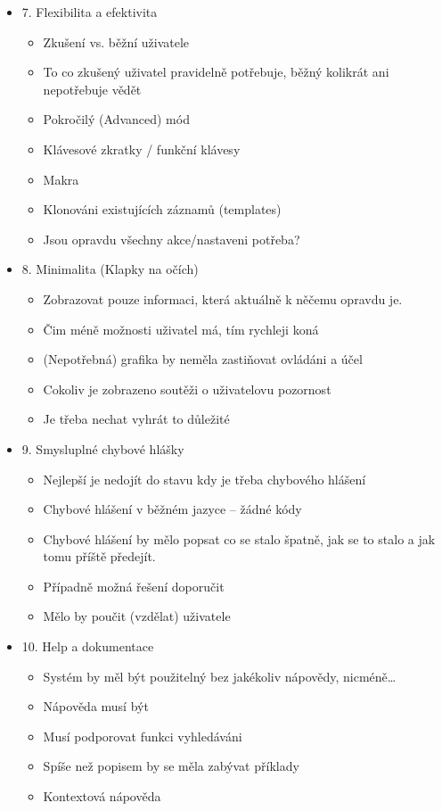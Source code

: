 \begin{itemize}
    \item 7. Flexibilita a efektivita
        \begin{itemize}
            \item Zkušení vs. běžní uživatele
            \item To co zkušený uživatel pravidelně potřebuje, běžný kolikrát ani nepotřebuje vědět
            \item Pokročilý (Advanced) mód
            \item Klávesové zkratky / funkční klávesy
            \item Makra
            \item Klonováni existujících záznamů (templates)
            \item Jsou opravdu všechny akce/nastaveni potřeba?
        \end{itemize}
    \item 8. Minimalita (Klapky na očích)
        \begin{itemize}
            \item Zobrazovat pouze informaci, která aktuálně k něčemu opravdu je.
            \item Čim méně možnosti uživatel má, tím rychleji koná
            \item (Nepotřebná) grafika by neměla zastiňovat ovládáni a účel
            \item Cokoliv je zobrazeno soutěži o uživatelovu pozornost
            \item Je třeba nechat vyhrát to důležité
        \end{itemize}
    \item 9. Smysluplné chybové hlášky
        \begin{itemize}
            \item Nejlepší je nedojít do stavu kdy je třeba chybového hlášení
            \item Chybové hlášení v běžném jazyce – žádné kódy
            \item Chybové hlášení by mělo popsat co se stalo špatně, jak se to stalo a jak tomu příště předejít.
            \item Případně možná řešení doporučit
            \item Mělo by poučit (vzdělat) uživatele
        \end{itemize}
    \item 10. Help a dokumentace
        \begin{itemize}
            \item Systém by měl být použitelný bez jakékoliv nápovědy, nicméně…
            \item Nápověda musí být
            \item Musí podporovat funkci vyhledáváni
            \item Spíše než popisem by se měla zabývat příklady
            \item Kontextová nápověda
        \end{itemize}
\end{itemize}

